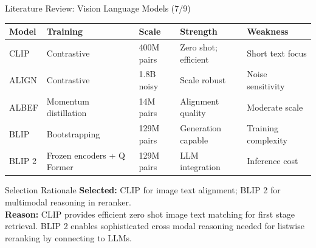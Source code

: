 \documentclass[aspectratio=169,xcolor=dvipsnames]{beamer}
\begin{document}
\begin{frame}{Literature Review: Vision Language Models (7/9)}
    \scriptsize
    \begin{table}
        \centering
        \renewcommand{\arraystretch}{1.05}
        \begin{tabular}{p{}|p{}|p{}|p{}|p{}}
        \toprule
        \textbf{Model} & \textbf{Training} & \textbf{Scale} & \textbf{Strength} & \textbf{Weakness} \\
        \midrule
        CLIP \cite{radford2021learning} & Contrastive & 400M pairs & Zero shot; efficient & Short text focus \\
        \midrule
        ALIGN \cite{jia2021scaling} & Contrastive & 1.8B noisy & Scale robust & Noise sensitivity \\
        \midrule
        ALBEF \cite{li2021align} & Momentum distillation & 14M pairs & Alignment quality & Moderate scale \\
        \midrule
        BLIP \cite{li2022blip} & Bootstrapping & 129M pairs & Generation capable & Training complexity \\
        \midrule
        BLIP 2 \cite{li2023blip2} & Frozen encoders + Q Former & 129M pairs & LLM integration & Inference cost \\
        \bottomrule
        \end{tabular}
    \end{table}
    
    \vspace{0.3em}
    \begin{block}{Selection Rationale}
        \textbf{Selected:} CLIP for image text alignment; BLIP 2 for multimodal reasoning in reranker. \\
        \textbf{Reason:} CLIP provides efficient zero shot image text matching for first stage retrieval. BLIP 2 enables sophisticated cross modal reasoning needed for listwise reranking by connecting to LLMs.
    \end{block}
\end{frame}
\end{document}
